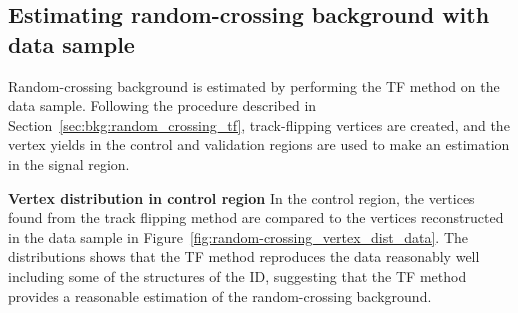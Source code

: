 \subsection{Estimating random-crossing background with data sample}
\label{sec:bkg:random_crossing_data}

Random-crossing background is estimated by performing the TF method on the data sample. Following the procedure described in Section~\ref{sec:bkg:random_crossing_tf}, track-flipping vertices are created, and the vertex yields in the control and validation regions are used to make an estimation in the signal region. 

\textbf{Vertex distribution in control region} In the control region, the \xx vertices found from the track flipping method are compared to the vertices reconstructed in the data sample in Figure~\ref{fig:random-crossing_vertex_dist_data}. The distributions shows that the TF method reproduces the data reasonably well including some of the structures of the ID, suggesting that the TF method provides a reasonable estimation of the random-crossing background.

